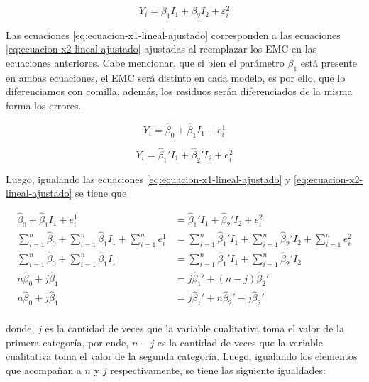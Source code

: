 \documentclass[
  11pt,
]{book}
\theoremstyle{definition}
\theoremstyle{definition}
\theoremstyle{definition}
\theoremstyle{definition}
\theoremstyle{remark}
\begin{document}
\begin{equation}
Y_i = \beta_1I_1 + \beta_2I_2 + \varepsilon_i^2
\label{eq:ecuacion-x2-lineal}
\end{equation}

Las ecuaciones \eqref{eq:ecuacion-x1-lineal-ajustado} corresponden a las ecuaciones \eqref{eq:ecuacion-x2-lineal-ajustado} ajustadas al reemplazar los EMC en las ecuaciones anteriores. Cabe mencionar, que si bien el parámetro \(\beta_1\) está presente en ambas ecuaciones, el EMC será distinto en cada modelo, es por ello, que lo diferenciamos con comilla, además, los residuos serán diferenciados de la misma forma los errores.

\begin{equation}
Y_i = \widehat{\beta}_0 + \widehat{\beta}_1I_1 + e_i^1
\label{eq:ecuacion-x1-lineal-ajustado}
\end{equation}

\begin{equation}
Y_i = \widehat{\beta}_1'I_1 + \widehat{\beta}_2'I_2 + e_i^2
\label{eq:ecuacion-x2-lineal-ajustado}
\end{equation}

Luego, igualando las ecuaciones \eqref{eq:ecuacion-x1-lineal-ajustado} y \eqref{eq:ecuacion-x2-lineal-ajustado} se tiene que

\begin{equation}
\begin{split}
\widehat{\beta}_0 + \widehat{\beta}_1I_1 + e_i^1 &= \widehat{\beta}_1'I_1 + \widehat{\beta}_2'I_2 + e_i^2\\
\sum_{i=1}^n\widehat{\beta}_0 + \sum_{i=1}^n\widehat{\beta}_1I_1 + \sum_{i=1}^ne_i^1 &= \sum_{i=1}^n\widehat{\beta}_1'I_1 + \sum_{i=1}^n\widehat{\beta}_2'I_2 + \sum_{i=1}^ne_i^2\\
\sum_{i=1}^n\widehat{\beta}_0 + \sum_{i=1}^n\widehat{\beta}_1I_1 &= \sum_{i=1}^n\widehat{\beta}_1'I_1 + \sum_{i=1}^n\widehat{\beta}_2'I_2\\
n\widehat{\beta}_0 + j\widehat{\beta}_1 &= j\widehat{\beta}_1' + (n-j)\widehat{\beta}_2'\\
n\widehat{\beta}_0 + j\widehat{\beta}_1 &= j\widehat{\beta}_1' + n\widehat{\beta}_2'-j\widehat{\beta}_2'\\
\end{split}
\label{eq:igualando-x1-x2}
\end{equation}

donde, \(j\) es la cantidad de veces que la variable cualitativa toma el valor de la primera categoría, por ende, \(n-j\) es la cantidad de veces que la variable cualitativa toma el valor de la segunda categoría. Luego, igualando los elementos que acompañan a \(n\) y \(j\) respectivamente, se tiene las siguiente igualdades:
\end{document}
